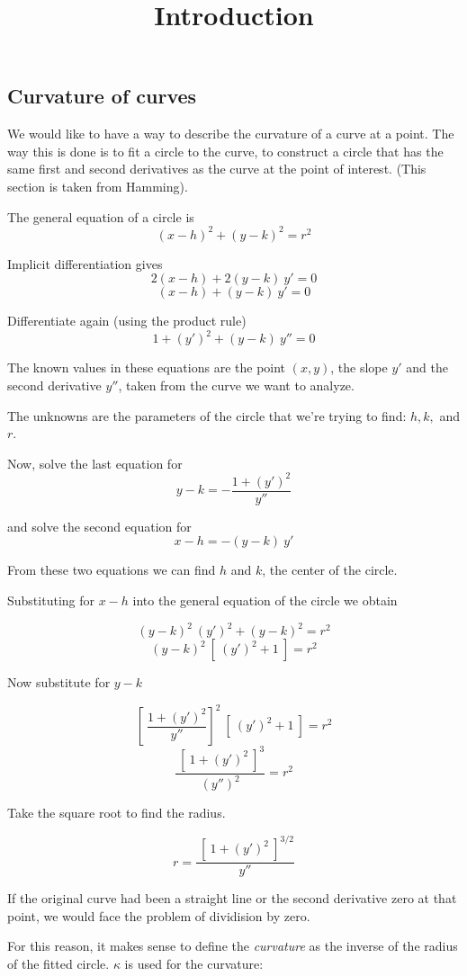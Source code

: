 \documentclass[11pt, oneside]{article}
\title{Introduction}
\date{}
\begin{document}
\maketitle
\Large

\subsection*{Curvature of curves}
We would like to have a way to describe the curvature of a curve at a point.  The way this is done is to fit a circle to the curve, to construct a circle that has the same first and second derivatives as the curve at the point of interest.  (This section is taken from Hamming).

The general equation of a circle is
\[ (x-h)^2 + (y-k)^2 = r^2 \]

Implicit differentiation gives
\[ 2(x - h) + 2(y - k) \ y' = 0 \]
\[ (x - h) + (y - k) \ y' = 0 \]

Differentiate again (using the product rule)
\[ 1 + (y')^2 +  (y - k) \ y''  = 0 \]

The known values in these equations are the point $(x,y)$, the slope $y'$ and the second derivative $y''$, taken from the curve we want to analyze.  

The unknowns are the parameters of the circle that we're trying to find:  $h,k,$ and $r$.  

Now, solve the last equation for 
\[ y - k = - \frac{1 + (y')^2}{y''} \]

and solve the second equation for
\[ x - h = -(y - k)\ y' \]

From these two equations we can find $h$ and $k$, the center of the circle.

Substituting for $x-h$ into the general equation of the circle we obtain

\[ (y - k)^2 \ (y')^2 + (y-k)^2 = r^2 \]
\[ (y-k)^2 \ [ \ (y')^2 + 1 \ ]  = r^2 \]

Now substitute for $y-k$

\[ [ \ \frac{1 + (y')^2}{y''} ]^2 \  [ \ (y')^2 + 1 \ ] = r^2 \]
\[ \frac{\ [ \ 1 + (y')^2 \ ]^3}{(y'')^2} = r^2 \]

Take the square root to find the radius.

\[  r =  \frac{\ [ \ 1 + (y')^2 \ ]^{3/2}}{y''} \]

If the original curve had been a straight line or the second derivative zero at that point, we would face the problem of dividision by zero.  

For this reason, it makes sense to define the \emph{curvature} as the inverse of the radius of the fitted circle.  $\kappa$ is used for the curvature:
\end{document}
